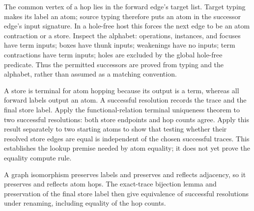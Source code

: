 



The common vertex of a hop lies in the forward edge's target list. Target
typing makes its label an atom; source typing therefore puts an atom in the
successor edge's input signature. In a hole-free host this forces the next
edge to be an atom contraction or a store. Inspect the alphabet: operations,
instances, and focuses have term inputs; boxes have thunk inputs; weakenings
have no inputs; term contractions have term inputs; holes are excluded by
the global hole-free predicate. Thus the permitted successors are proved
from typing and the alphabet, rather than assumed as a matching convention.



A store is terminal for atom hopping because its output is a term, whereas
all forward labels output an atom. A successful resolution records the
trace and the final store label. Apply the functional-relation terminal
uniqueness theorem to two successful resolutions: both store endpoints and
hop counts agree. Apply this result separately to two starting atoms to
show that testing whether their resolved store edges are equal is independent
of the chosen successful traces. This establishes the lookup premise needed
by atom equality; it does not yet prove the equality compute rule.





A graph isomorphism preserves labels and preserves and reflects adjacency,
so it preserves and reflects atom hops. The exact-trace bijection lemma and
preservation of the final store label then give equivalence of successful
resolutions under renaming, including equality of the hop counts.

